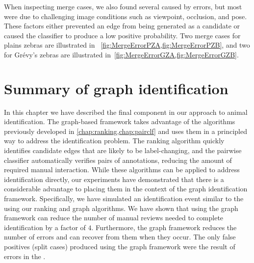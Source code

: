     When inspecting merge cases, we also found several caused by \groundtruth{} errors, but most were due to
      challenging image conditions such as viewpoint, occlusion, and pose.
    These factors either prevented an edge from being generated as a candidate or caused the classifier to
      produce a low positive probability.
    Two merge cases for plains zebras are illustrated in ~\cref{fig:MergeErrorPZA,fig:MergeErrorPZB}, and two for
      Grévy's zebras are illustrated in~\cref{fig:MergeErrorGZA,fig:MergeErrorGZB}.


    \SplitErrorsPZ{}

    \SplitErrorsGZ{}

    \MergeErrorPZA{}

    \MergeErrorPZB{}

    \MergeErrorGZA{}

    \MergeErrorGZB{}

 
\FloatBarrier{}
\section{Summary of graph identification}\label{sec:graphconclusion}

In this chapter we have described the final component in our approach to animal identification.
The graph-based framework takes advantage of the algorithms previously developed in
  \cref{chap:ranking,chap:pairclf} and uses them in a principled way to address the identification problem.
The ranking algorithm quickly identifies candidate edges that are likely to be label-changing, and the pairwise
  classifier automatically verifies pairs of annotations, reducing the amount of required manual interaction.
While these algorithms can be applied to address identification directly, our experiments have demonstrated that
  there is a considerable advantage to placing them in the context of the graph identification framework.
Specifically, we have simulated an identification event similar to the \GZC{} using our ranking and graph
  algorithms.
We have shown that using the graph framework can reduce the number of manual reviews needed to complete
  identification by a factor of $4$.
Furthermore, the graph framework reduces the number of errors and can recover from them when they occur.
The only false positives (split cases) produced using the graph framework were the result of errors in the
  \groundtruth{}.

